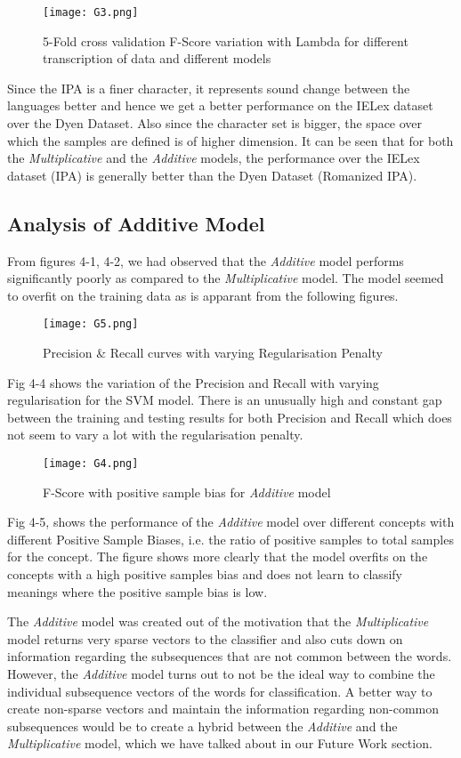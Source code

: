 \begin{figure}[h]
\centering
\texttt{[image: G3.png]}
\caption{5-Fold cross validation F-Score variation with Lambda for different transcription of data and different models}
\end{figure}

Since the IPA is a finer character, it represents sound change between the languages better and hence we get a better performance on the IELex dataset over the Dyen Dataset. Also since the character set is bigger, the space over which the samples are defined is of higher dimension. It can be seen that for both the \textit{Multiplicative} and the \textit{Additive} models, the performance over the IELex dataset (IPA) is generally better than the Dyen Dataset (Romanized IPA).

\subsection{Analysis of Additive Model}

From figures 4-1, 4-2, we had observed that the \textit{Additive} model performs significantly poorly as compared to the \textit{Multiplicative} model. The model seemed to overfit on the  training data  as is apparant from the following figures.

\begin{figure}[h]
\centering
\texttt{[image: G5.png]}
\caption{Precision \& Recall curves with varying Regularisation Penalty}
\end{figure}

Fig 4-4 shows the variation of the Precision and Recall with varying regularisation for the SVM model. There is an unusually high and constant gap between the training and testing results for both Precision and Recall which does not seem to vary a lot with the regularisation penalty.

\begin{figure}[h]
\centering
\texttt{[image: G4.png]}
\caption{F-Score with positive sample bias for \textit{Additive} model}
\end{figure}

Fig 4-5, shows the performance of the \textit{Additive} model over different concepts with different Positive Sample Biases, i.e. the ratio of positive samples to total samples for the concept. The figure shows more clearly that the model overfits on the concepts with a high positive samples bias and does not learn to classify meanings where the positive sample bias is low.

The \textit{Additive} model was created out of the motivation that the \textit{Multiplicative} model returns very sparse vectors to the classifier and also cuts down on information regarding the subsequences that are not common between the words. However, the \textit{Additive} model turns out to not be the ideal way to combine the individual subsequence vectors of the words for classification. A better way to create non-sparse vectors and maintain the information regarding non-common subsequences would be to create a hybrid between the \textit{Additive} and the \textit{Multiplicative} model, which we have talked about in our Future Work section.

